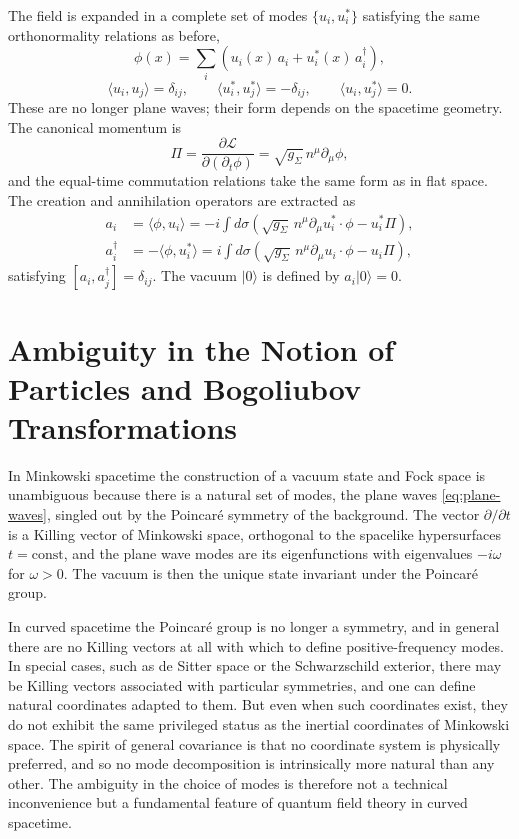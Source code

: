 The field is expanded in a complete set of modes $\{u_i, u_i^*\}$
satisfying the same orthonormality relations as before,
\begin{equation}
	\phi(x) = \sum_i\left(u_i(x)\,a_i + u_i^*(x)\,a_i^\dagger\right),
\end{equation}
\begin{equation}
	\langle u_i,u_j\rangle = \delta_{ij}, \qquad
	\langle u_i^*,u_j^*\rangle = -\delta_{ij}, \qquad
	\langle u_i,u_j^*\rangle = 0.
\end{equation}
These are no longer plane waves; their form depends on the spacetime
geometry. The canonical momentum is
\begin{equation}
	\Pi = \frac{\partial\mathcal{L}}{\partial(\partial_t\phi)}
	= \sqrt{g_\Sigma}\,n^\mu\partial_\mu\phi,
\end{equation}
and the equal-time commutation relations take the same form as in flat
space. The creation and annihilation operators are extracted as
\begin{align}
	a_i         & = \langle\phi,u_i\rangle
	= -i\int d\sigma\left(\sqrt{g_\Sigma}\,n^\mu\partial_\mu u_i^*
	\cdot\phi - u_i^*\Pi\right),              \\
	a_i^\dagger & = -\langle\phi,u_i^*\rangle
	= i\int d\sigma\left(\sqrt{g_\Sigma}\,n^\mu\partial_\mu u_i
	\cdot\phi - u_i\Pi\right),
\end{align}
satisfying $[a_i,a_j^\dagger] = \delta_{ij}$. The vacuum $|0\rangle$
is defined by $a_i|0\rangle = 0$.

\section{Ambiguity in the Notion of Particles and Bogoliubov
  Transformations}
In Minkowski spacetime the construction of a vacuum state and Fock
space is unambiguous because there is a natural set of modes,
the plane waves \eqref{eq:plane-waves}, singled out by the Poincar\'{e}
symmetry of the background. The vector $\partial/\partial t$ is a
Killing vector of Minkowski space, orthogonal to the spacelike
hypersurfaces $t = \text{const}$, and the plane wave modes are its
eigenfunctions with eigenvalues $-i\omega$ for $\omega > 0$. The
vacuum is then the unique state invariant under the Poincar\'{e} group.

In curved spacetime the Poincar\'{e} group is no longer a symmetry,
and in general there are no Killing vectors at all with which to define
positive-frequency modes. In special cases, such as de Sitter space or
the Schwarzschild exterior, there may be Killing vectors associated
with particular symmetries, and one can define natural coordinates
adapted to them. But even when such coordinates exist, they do not
exhibit the same privileged status as the inertial coordinates of
Minkowski space. The spirit of general covariance is that no coordinate
system is physically preferred, and so no mode decomposition is
intrinsically more natural than any other. The ambiguity in the choice
of modes is therefore not a technical inconvenience but a fundamental
feature of quantum field theory in curved spacetime.

